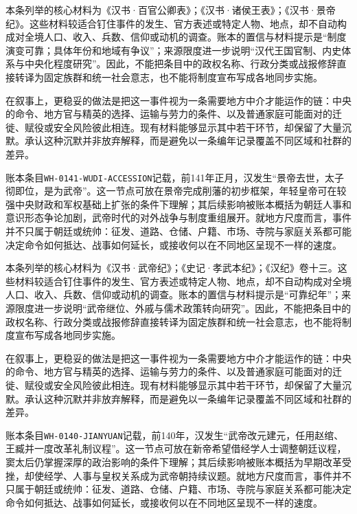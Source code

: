 本条列举的核心材料为《汉书·百官公卿表》；《汉书·诸侯王表》；《汉书·景帝纪》。这些材料较适合钉住事件的发生、官方表述或特定人物、地点，却不自动构成对全境人口、收入、兵数、信仰或动机的调查。账本的置信与材料提示是“制度演变可靠；具体年份和地域有争议”；来源限度进一步说明“汉代王国官制、内史体系与中央化程度研究”。因此，不能把条目中的政权名称、行政分类或战报修辞直接转译为固定族群和统一社会意志，也不能将制度宣布写成各地同步实施。

在叙事上，更稳妥的做法是把这一事件视为一条需要地方中介才能运作的链：中央的命令、地方官与精英的选择、运输与劳力的条件、以及普通家庭可能面对的迁徙、赋役或安全风险彼此相连。现有材料能够显示其中若干环节，却保留了大量沉默。承认这种沉默并非放弃解释，而是避免以一条编年记录覆盖不同区域和社群的差异。

账本条目\texttt{WH-0141-WUDI-ACCESSION}记载，前141年正月，汉发生“景帝去世，太子彻即位，是为武帝”。这一节点可放在景帝完成削藩的初步框架，年轻皇帝可在较强中央财政和军权基础上扩张的条件下理解；其后续影响被账本概括为朝廷人事和意识形态争论加剧，武帝时代的对外战争与制度重组展开。就地方尺度而言，事件并不只属于朝廷或统帅：征发、道路、仓储、户籍、市场、寺院与家庭关系都可能决定命令如何抵达、战事如何延长，或接收何以在不同地区呈现不一样的速度。

本条列举的核心材料为《汉书·武帝纪》；《史记·孝武本纪》；《汉纪》卷十三。这些材料较适合钉住事件的发生、官方表述或特定人物、地点，却不自动构成对全境人口、收入、兵数、信仰或动机的调查。账本的置信与材料提示是“可靠纪年”；来源限度进一步说明“武帝继位、外戚与儒术政策转向研究”。因此，不能把条目中的政权名称、行政分类或战报修辞直接转译为固定族群和统一社会意志，也不能将制度宣布写成各地同步实施。

在叙事上，更稳妥的做法是把这一事件视为一条需要地方中介才能运作的链：中央的命令、地方官与精英的选择、运输与劳力的条件、以及普通家庭可能面对的迁徙、赋役或安全风险彼此相连。现有材料能够显示其中若干环节，却保留了大量沉默。承认这种沉默并非放弃解释，而是避免以一条编年记录覆盖不同区域和社群的差异。

账本条目\texttt{WH-0140-JIANYUAN}记载，前140年，汉发生“武帝改元建元，任用赵绾、王臧并一度改革礼制议程”。这一节点可放在新帝希望借经学人士调整朝廷议程，窦太后仍掌握深厚的政治影响的条件下理解；其后续影响被账本概括为早期改革受挫，却使经学、人事与皇权关系成为武帝朝持续议题。就地方尺度而言，事件并不只属于朝廷或统帅：征发、道路、仓储、户籍、市场、寺院与家庭关系都可能决定命令如何抵达、战事如何延长，或接收何以在不同地区呈现不一样的速度。

